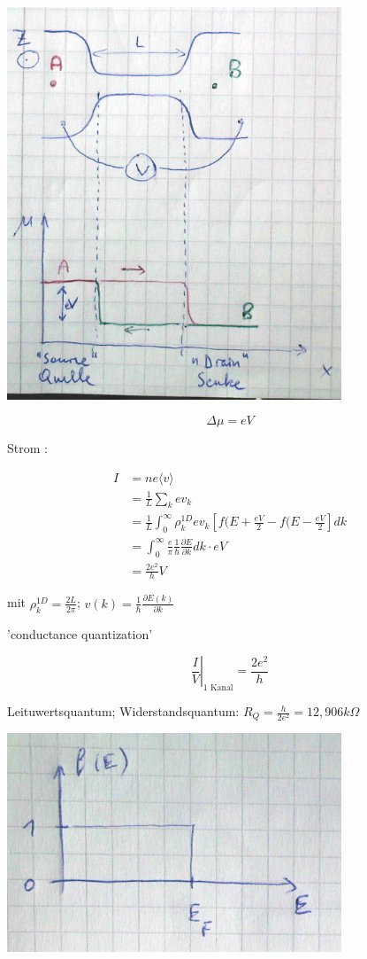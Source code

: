 \includegraphics[width=0.75\textwidth]{kap11_04.png}

\[\Delta \mu = eV\]

Strom : 

\begin{align}
I &= ne\langle  v\rangle \\
&= \frac{1}{L}\sum_k ev_k \\
&= \frac{1}{L}\int_0^{\infty} \rho^{1D}_{k} ev_k\left[f(E+\frac{eV}{2}-f(E-\frac{eV}{2}\right]dk \\
&=\int_0^{\infty}\frac{e}{\pi}\frac{1}{\hbar}\frac{\partial E}{\partial k}dk\cdot eV \\
&=\frac{2e^2}{h}V
\end{align}

mit \(\rho^{1D}_k=\frac{2L}{2\pi}\); \(v(k)=\frac{1}{\hbar}\frac{\partial E(k)}{\partial k}\)

'conductance quantization' 

\[\left.\frac{I}{V}\right|_{\text{1 Kanal}} = \frac{2e^2}{h}\]

Leituwertsquantum; Widerstandsquantum: \(R_Q=\frac{h}{2e^2}=12,906 k\Omega\)

\includegraphics[width=0.75\textwidth]{kap11_05.png}


